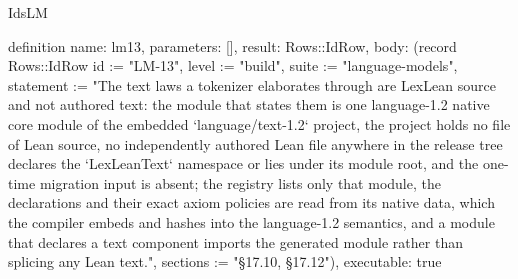 \begin{lexlean}{IdsLM}
\begin{semanticmodule}
definition{
  name: lm13,
  parameters: [],
  result: Rows::IdRow,
  body: (record Rows::IdRow {id := "LM-13", level := "build", suite := "language-models", statement := "The text laws a tokenizer elaborates through are LexLean source and not authored text: the module that states them is one language-1.2 native core module of the embedded `language/text-1.2` project, the project holds no file of Lean source, no independently authored Lean file anywhere in the release tree declares the `LexLeanText` namespace or lies under its module root, and the one-time migration input is absent; the registry lists only that module, the declarations and their exact axiom policies are read from its native data, which the compiler embeds and hashes into the language-1.2 semantics, and a module that declares a text component imports the generated module rather than splicing any Lean text.", sections := "§17.10, §17.12"}),
  executable: true
}
\end{semanticmodule}
\end{lexlean}

